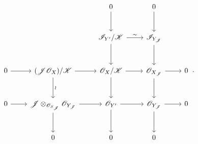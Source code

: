 \[
\begin{tikzcd}[column sep=2.3em, row sep=2.8em]
 && 0 \arrow[d] & 0 \arrow[d] &
 \\
 &&
 \mathscr I_{Y'}/\mathscr K
   \arrow[r,"\sim"]
   \arrow[d]
 &
 \mathscr I_{Y_{\mathscr J}}
   \arrow[d]
 &
 \\
 0 \arrow[r]
 &
 (\mathscr J\mathscr O_X)/\mathscr K
   \arrow[r]
   \arrow[d,"\wr"]
 &
 \mathscr O_X/\mathscr K
   \arrow[r]
   \arrow[d]
 &
 \mathscr O_{X_{\mathscr J}}
   \arrow[r]
   \arrow[d]
 &
 0
 \\
 0 \arrow[r]
 &
 \mathscr J\otimes_{\mathscr O_{S_{\mathscr J}}}
   \mathscr O_{Y_{\mathscr J}}
   \arrow[r]
   \arrow[d]
 &
 \mathscr O_{Y'}
   \arrow[r]
   \arrow[d]
 &
 \mathscr O_{Y_{\mathscr J}}
   \arrow[r]
   \arrow[d]
 &
 0
 \\
 & 0 & 0 & 0 &
\end{tikzcd}
\, .
\]
